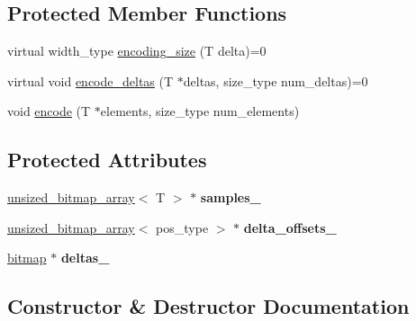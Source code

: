 \subsection*{Protected Member Functions}
\begin{DoxyCompactItemize}
\item 
virtual width\+\_\+type \hyperlink{classdialog_1_1delta__encoded__array_a5a7dd4499765ed12a030b25ca3452ea3}{encoding\+\_\+size} (T delta)=0
\item 
virtual void \hyperlink{classdialog_1_1delta__encoded__array_a4ad7e0110c90c91684873f40c778cd6e}{encode\+\_\+deltas} (T $\ast$deltas, size\+\_\+type num\+\_\+deltas)=0
\item 
void \hyperlink{classdialog_1_1delta__encoded__array_aaab973ffb4fa2d62fb658e5dbcc0acad}{encode} (T $\ast$elements, size\+\_\+type num\+\_\+elements)
\end{DoxyCompactItemize}
\subsection*{Protected Attributes}
\begin{DoxyCompactItemize}
\item 
\mbox{\label{classdialog_1_1delta__encoded__array_af92d09ac19d1c6ac9f9271b0fc857404}} 
\hyperlink{classdialog_1_1unsized__bitmap__array}{unsized\+\_\+bitmap\+\_\+array}$<$ T $>$ $\ast$ {\bfseries samples\+\_\+}
\item 
\mbox{\label{classdialog_1_1delta__encoded__array_ad2ca110a0d18668bc6503effd89eb8a8}} 
\hyperlink{classdialog_1_1unsized__bitmap__array}{unsized\+\_\+bitmap\+\_\+array}$<$ pos\+\_\+type $>$ $\ast$ {\bfseries delta\+\_\+offsets\+\_\+}
\item 
\mbox{\label{classdialog_1_1delta__encoded__array_ab1b64295148db2954a85757aad6865cf}} 
\hyperlink{classdialog_1_1bitmap}{bitmap} $\ast$ {\bfseries deltas\+\_\+}
\end{DoxyCompactItemize}


\subsection{Constructor \& Destructor Documentation}
\mbox{\label{classdialog_1_1delta__encoded__array_a3b5f62d85c360a2ac4bc30db2b790d8d}} 
